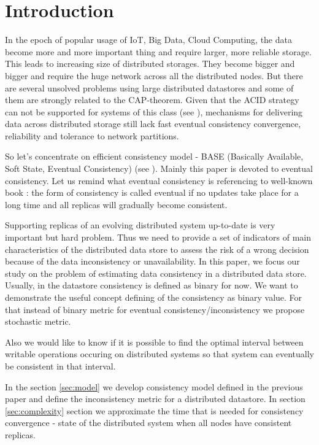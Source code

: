 \documentclass[a4paper,14pt]{llncs}
\begin{document}
\section{Introduction}\label{sec:intro}
In the epoch of popular usage of IoT, Big Data, Cloud Computing, the data become more and more important thing and require larger, more reliable storage. This leads to increasing size of distributed storages. They become bigger and bigger and require the huge network across all the distributed nodes.
But there are several unsolved problems using large distributed datastores and some of them are strongly related to the CAP-theorem. 
Given that the ACID strategy can not be supported for systems of this class (see \cite{bib:brewer}), mechanisms for delivering data across distributed storage still lack fast eventual consistency convergence, reliability and tolerance to network partitions.

So let's concentrate on efficient consistency model - BASE (Basically Available, Soft State, Eventual Consistency) (see \cite{bib:acid_vs_base}).
Mainly this paper is devoted to eventual consistency. Let us remind what eventual consistency is referencing to well-known book \cite{bib:tanenbaum}: the form of consistency is called eventual if no updates take place for a long time and all replicas will gradually become consistent.

Supporting replicas of an evolving distributed system up-to-date is very important but hard problem. Thus we need to provide a set of indicators of main characteristics of the distributed data store to assess the risk of a wrong decision because of the data inconsistency or unavailability.
In this paper, we focus our study on the problem of estimating data consistency in a distributed data store. Usually, in the datastore consistency is defined as binary for now. We want to demonstrate the useful concept defining of the consistency as binary value. 
For that instead of binary metric for eventual consistency/inconsistency we propose stochastic metric.

Also we would like to know if it is possible to find the optimal interval between writable operations occuring on distributed systems so that system can eventually be consistent in that interval.

In the section \ref{sec:model} we develop consistency model defined in the previous paper \cite{bib:prob_approach} and define the inconsistency metric for a distributed datastore.
In section \ref{sec:complexity} section we approximate the time that is needed for consistency convergence - state of the distributed system when all nodes have consistent replicas.
\end{document}
